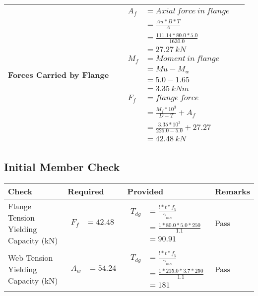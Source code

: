 \documentclass{article}%
\begin{document}
\begin{longtable}{|p{4cm}|p{3.5cm}|p{6.5cm}|p{1.5cm}|}
\hline%
Forces Carried by Flange&&$\begin{aligned} A_f&= Axial~force~ in ~flange  \\ &= \frac{Au * B *T}{A} \\ &= \frac{111.14 * 80.0*5.0}{1630.0} \\ &=27.27~ kN\\ M_f& =Moment~ in~ flange \\  & = Mu-M_w\\ &= 5.0-1.65\\ &=3.35~{kNm}\\  F_f& =flange~force  \\ & = \frac{M_f *10^3}{D-T} + A_f \\ &= \frac{3.35* 10^3}{225.0-5.0} +27.27 \\ &=42.48~kN \end{aligned}$&\\%
\hline%
\end{longtable}

%
\newpage%
\subsection{Initial Member Check}%
\label{subsec:InitialMemberCheck}%
\renewcommand{\arraystretch}{1.2}%
\begin{longtable}{|p{3cm}|p{4.5cm}|p{6.5cm}|p{1.5cm}|}%
\hline%
\rowcolor{OsdagGreen}%
Check&Required&Provided&Remarks\\%
\hline%
\endhead%
\hline%
Flange Tension Yielding Capacity (kN)&$\begin{aligned} F_f &=42.48\end{aligned}$&$\begin{aligned} T_{dg} &= \frac{l*t*f_y}{\gamma_{mo}}\\ &=\frac{1*80.0*5.0*250}{1.1}\\ &=90.91\end{aligned}$&Pass\\%
\hline%
Web Tension Yielding Capacity (kN)&$\begin{aligned} A_w &=54.24\end{aligned}$&$\begin{aligned} T_{dg} &= \frac{l*t*f_y}{\gamma_{mo}}\\ &=\frac{1*215.0*3.7*250}{1.1}\\ &=181\end{aligned}$&Pass\\%
\hline%
\end{longtable}
\end{document}
